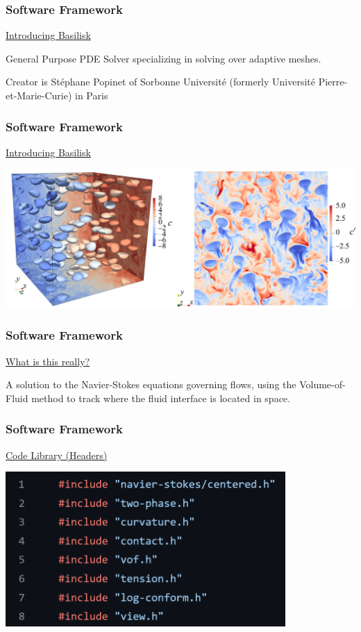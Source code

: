 \documentclass[12pt]{beamer}
\begin{document}
\begin{frame}
    \frametitle{Software Framework}
    \underline{Introducing Basilisk}

    General Purpose PDE Solver specializing in solving over adaptive meshes.

    Creator is Stéphane Popinet of Sorbonne Université (formerly Université Pierre-et-Marie-Curie) in Paris
\end{frame}
\begin{frame}
    \frametitle{Software Framework}
    \underline{Introducing Basilisk}

    \includegraphics[width=\textwidth]{img/3-hidman2023.jpg}
\end{frame}
\begin{frame}
    \frametitle{Software Framework}
    \underline{What is this really?}

    A solution to the Navier-Stokes equations governing flows,
    using the Volume-of-Fluid method to track where the fluid 
    interface is located in space.
\end{frame}
\begin{frame}
    \frametitle{Software Framework}
    \underline{Code Library (Headers)}

    \includegraphics[width=0.8\textwidth]{img/5-headers.png}
\end{frame}
\end{document}
